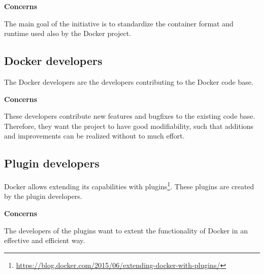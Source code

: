 \textbf{Concerns}
\begin{description}[labelindent=25pt,style=multiline,leftmargin=4.0cm,font=\normalfont\itshape]

\item[Portability] The main goal of the initiative is to standardize the container format and runtime used also by the Docker project.

\end{description}

\subsection*{Docker developers}
The Docker developers are the developers contributing to the Docker code base.

\textbf{Concerns}
\begin{description}[labelindent=25pt,style=multiline,leftmargin=4.0cm,font=\normalfont\itshape]

\item[Maintainability] These developers contribute new features and bugfixes to the existing code base. Therefore, they want the project to have good modifiability, such that additions and improvements can be realized without to much effort.

\end{description}

\subsection*{Plugin developers}
Docker allows extending its capabilities with plugins\footnote{\url{https://blog.docker.com/2015/06/extending-docker-with-plugins/}}. These plugins are created by the plugin developers.

\textbf{Concerns}
\begin{description}[labelindent=25pt,style=multiline,leftmargin=4.0cm,font=\normalfont\itshape]

\item[Adaptability\\(Portability)] The developers of the plugins want to extent the functionality of Docker in an effective and efficient way. 

\end{description}